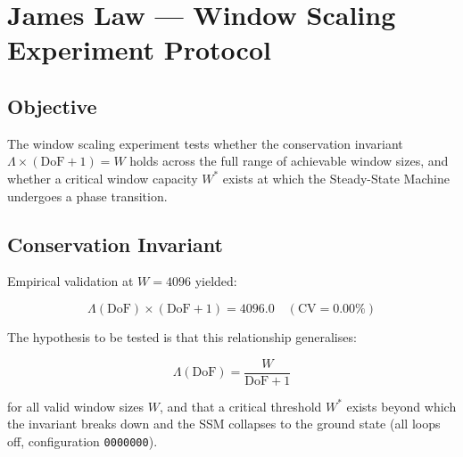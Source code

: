 
\section{James Law — Window Scaling Experiment Protocol}
\label{sec:james-law-protocol}

\subsection{Objective}

The window scaling experiment tests whether the conservation invariant
$\Lambda \times (\mathrm{DoF} + 1) = W$ holds across the full range of
achievable window sizes, and whether a critical window capacity $W^*$ exists
at which the Steady-State Machine undergoes a phase transition.

\subsection{Conservation Invariant}

Empirical validation at $W = 4096$ yielded:

\begin{equation}
  \Lambda(\mathrm{DoF}) \times (\mathrm{DoF} + 1) = 4096.0 \quad
  (\text{CV} = 0.00\%)
  \label{eq:james-law}
\end{equation}

The hypothesis to be tested is that this relationship generalises:

\begin{equation}
  \Lambda(\mathrm{DoF}) = \frac{W}{\mathrm{DoF} + 1}
\end{equation}

for all valid window sizes $W$, and that a critical threshold $W^*$ exists
beyond which the invariant breaks down and the SSM collapses to the ground
state (all loops off, configuration \texttt{0000000}).


